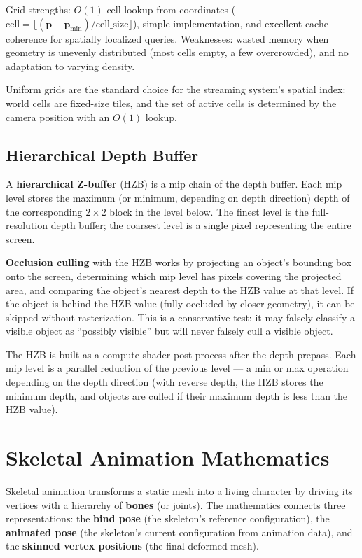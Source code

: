 \documentclass[
  11pt,
  letterpaper,
  DIV=11,
  numbers=noendperiod,
  twoside,
  open=right]{scrreprt}
\begin{document}
Grid strengths: \(O(1)\) cell lookup from coordinates
(\(\text{cell} = \lfloor (\mathbf{p} - \mathbf{p}_{\min}) / \text{cell\_size} \rfloor\)),
simple implementation, and excellent cache coherence for spatially
localized queries. Weaknesses: wasted memory when geometry is unevenly
distributed (most cells empty, a few overcrowded), and no adaptation to
varying density.

Uniform grids are the standard choice for the streaming system's spatial
index: world cells are fixed-size tiles, and the set of active cells is
determined by the camera position with an \(O(1)\) lookup.

\subsection{Hierarchical Depth Buffer}\label{hierarchical-depth-buffer}

A \textbf{hierarchical Z-buffer} (HZB) is a mip chain of the depth
buffer. Each mip level stores the maximum (or minimum, depending on
depth direction) depth of the corresponding \(2 \times 2\) block in the
level below. The finest level is the full-resolution depth buffer; the
coarsest level is a single pixel representing the entire screen.

\textbf{Occlusion culling} with the HZB works by projecting an object's
bounding box onto the screen, determining which mip level has pixels
covering the projected area, and comparing the object's nearest depth to
the HZB value at that level. If the object is behind the HZB value
(fully occluded by closer geometry), it can be skipped without
rasterization. This is a conservative test: it may falsely classify a
visible object as ``possibly visible'' but will never falsely cull a
visible object.

The HZB is built as a compute-shader post-process after the depth
prepass. Each mip level is a parallel reduction of the previous level
--- a min or max operation depending on the depth direction (with
reverse depth, the HZB stores the minimum depth, and objects are culled
if their maximum depth is less than the HZB value).

\section{Skeletal Animation
Mathematics}\label{skeletal-animation-mathematics}

Skeletal animation transforms a static mesh into a living character by
driving its vertices with a hierarchy of \textbf{bones} (or joints). The
mathematics connects three representations: the \textbf{bind pose} (the
skeleton's reference configuration), the \textbf{animated pose} (the
skeleton's current configuration from animation data), and the
\textbf{skinned vertex positions} (the final deformed mesh).
\end{document}
